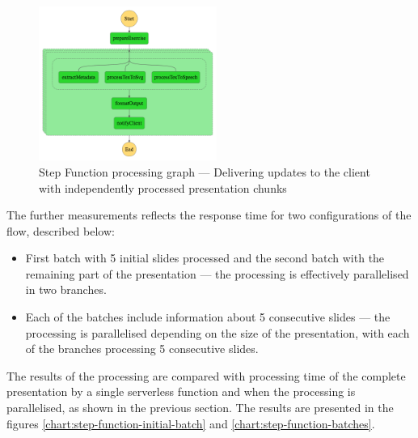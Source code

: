 \begin{figure}[h]
    \centering
    \includegraphics[width=0.52\textwidth]{assets/04-serverless-for-web-apps/stepFunctionGraphInitialBatch.png}
    \caption{Step Function processing graph --- Delivering updates to the client with independently processed presentation chunks}
    \label{fig:step-function-pushing-updates-to-the-client-with-partially-processed-presentation}
\end{figure}

The further measurements reflects the response time for two configurations of the flow, described below:

\begin{itemize}
   \item First batch with 5 initial slides processed and the second batch with the remaining part of the presentation --- the processing is effectively parallelised in two branches.
   \item Each of the batches include information about 5 consecutive slides --- the processing is parallelised depending on the size of the presentation, with each of the branches processing 5 consecutive slides.
\end{itemize}

The results of the processing are compared with processing time of the complete presentation by a single serverless function and when the processing is parallelised, as shown in the previous section. The results are presented in the figures \ref{chart:step-function-initial-batch} and \ref{chart:step-function-batches}.

\datasetUploadInitialBatch


